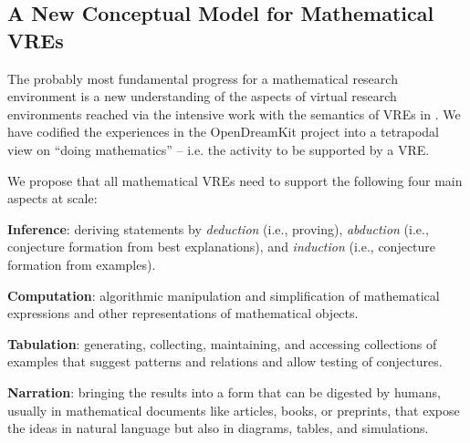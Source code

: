 \subsection{A New Conceptual Model for Mathematical VREs}\label{sec:tetrapod}
The probably most fundamental progress for a mathematical research environment is a new understanding of the aspects of virtual research environments reached via the intensive work with the semantics of VREs in .  We have codified the experiences in the OpenDreamKit project into a tetrapodal view on ``doing
mathematics'' -- i.e. the activity to be supported by a VRE.

We propose that all mathematical VREs need to support the following four main aspects at scale:
\begin{compactenum}[\em i\rm)]
\item \textbf{Inference}: deriving statements by \emph{deduction} (i.e.,
  proving), \emph{abduction} (i.e., conjecture formation from best
  explanations), and \emph{induction} (i.e., conjecture formation from examples).
\item \textbf{Computation}: algorithmic manipulation and simplification
  of mathematical expressions and other representations of
  mathematical objects.
\item \textbf{Tabulation}: generating, collecting, maintaining, and accessing
  collections of examples that suggest patterns and relations and allow testing
  of conjectures. 
\item \textbf{Narration}: bringing the results into a form that can be digested by humans,
  usually in mathematical documents like articles, books, or preprints, that expose the
  ideas in natural language but also in diagrams, tables, and simulations.
\end{compactenum} 

